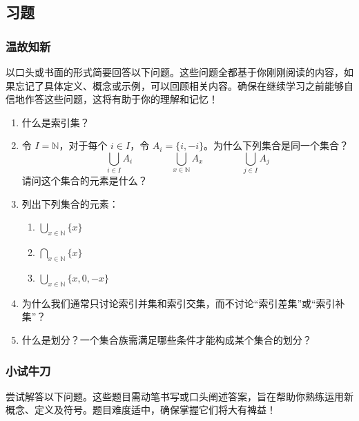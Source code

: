 \subsection{习题}

\subsubsection*{温故知新}

以口头或书面的形式简要回答以下问题。这些问题全都基于你刚刚阅读的内容，如果忘记了具体定义、概念或示例，可以回顾相关内容。确保在继续学习之前能够自信地作答这些问题，这将有助于你的理解和记忆！

\begin{enumerate}[label=(\arabic*)]
    \item 什么是索引集？
    \item 令 $I = \mathbb{N}$，对于每个 $i \in I$，令 $A_i = \{i, -i\}$。为什么下列集合是同一个集合？
    \[\bigcup_{i \in I} A_i \qquad\qquad \bigcup_{x \in \mathbb{N}} A_x \qquad\qquad \bigcup_{j \in I} A_j\]
    请问这个集合的元素是什么？
    \item 列出下列集合的元素：
    \begin{multicols*}{3}
        \begin{enumerate}[label=(\alph*)]
            \item $\displaystyle{\bigcup_{x \in \mathbb{N}}\{x\}}$
            \item $\displaystyle{\bigcap_{x \in \mathbb{N}}\{x\}}$
            \item $\displaystyle{\bigcup_{x \in \mathbb{N}}\{x,0,-x\}}$
        \end{enumerate}
    \end{multicols*}
    \item 为什么我们通常只讨论索引并集和索引交集，而不讨论``索引差集''或``索引补集''？
    \item 什么是划分？一个集合族需满足哪些条件才能构成某个集合的划分？
\end{enumerate}

\subsubsection*{小试牛刀}

尝试解答以下问题。这些题目需动笔书写或口头阐述答案，旨在帮助你熟练运用新概念、定义及符号。题目难度适中，确保掌握它们将大有裨益！

